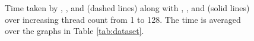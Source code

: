 \begin{figure}[!hbt]
  \centering
   \\[-1ex]
   \\[-2ex]
\caption{Time taken by \StaWbar{}, \NaiWbar{}, and \FroWbar{} (dashed lines) along with \StaBarf{}, \NaiBarf{}, and \FroBarf{} (solid lines) over increasing thread count from 1 to 128. The time is averaged over the graphs in Table \ref{tab:dataset}.}
  \label{fig:strong-scaling}
\end{figure}
